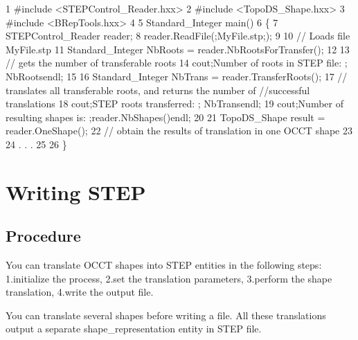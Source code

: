 \begin{DoxyCode}
1 #include <STEPControl\_Reader.hxx> 
2 #include <TopoDS\_Shape.hxx> 
3 #include <BRepTools.hxx> 
4 
5 Standard\_Integer main() 
6 \{ 
7   STEPControl\_Reader reader; 
8   reader.ReadFile(;MyFile.stp;); 
9 
10   // Loads file MyFile.stp 
11   Standard\_Integer NbRoots = reader.NbRootsForTransfer(); 
12 
13   // gets the number of transferable roots 
14   cout;Number of roots in STEP file: ; NbRootsendl; 
15 
16   Standard\_Integer NbTrans = reader.TransferRoots(); 
17   // translates all transferable roots, and returns the number of    //successful translations 
18   cout;STEP roots transferred: ; NbTransendl; 
19   cout;Number of resulting shapes is: ;reader.NbShapes()endl; 
20 
21   TopoDS\_Shape result = reader.OneShape(); 
22   // obtain the results of translation in one OCCT shape 
23 
24   . . . 
25 
26 \} 
\end{DoxyCode}
\hypertarget{occt_user_guides__step_occt_step_3}{}\section{Writing S\+T\+EP}\label{occt_user_guides__step_occt_step_3}
\hypertarget{occt_user_guides__step_occt_step_3_1}{}\subsection{Procedure}\label{occt_user_guides__step_occt_step_3_1}
You can translate O\+C\+CT shapes into S\+T\+EP entities in the following steps\+: 1.\+initialize the process, 2.\+set the translation parameters, 3.\+perform the shape translation, 4.\+write the output file.

You can translate several shapes before writing a file. All these translations output a separate shape\+\_\+representation entity in S\+T\+EP file.

